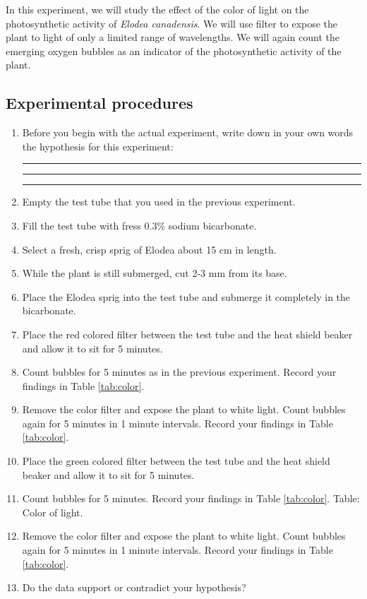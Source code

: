 \documentclass[]{book}
\begin{document}
In this experiment, we will study the effect of the color of light on the photosynthetic activity of \emph{Elodea canadensis}. We will use filter to expose the plant to light of only a limited range of wavelengths. We will again count the emerging oxygen bubbles as an indicator of the photosynthetic activity of the plant.

\hypertarget{experimental-procedures-25}{%
\subsection{Experimental procedures}\label{experimental-procedures-25}}

\begin{enumerate}
\def\labelenumi{\arabic{enumi}.}
\item
  Before you begin with the actual experiment, write down in your own words the hypothesis for this experiment:

  \begin{center}\rule{0.5\linewidth}{\linethickness}\end{center}

  \begin{center}\rule{0.5\linewidth}{\linethickness}\end{center}

  \begin{center}\rule{0.5\linewidth}{\linethickness}\end{center}
\item
  Empty the test tube that you used in the previous experiment.
\item
  Fill the test tube with fress 0.3\% sodium bicarbonate.
\item
  Select a fresh, crisp sprig of Elodea about 15 cm in length.
\item
  While the plant is still submerged, cut 2-3 mm from its base.
\item
  Place the Elodea sprig into the test tube and submerge it completely in the bicarbonate.
\item
  Place the red colored filter between the test tube and the heat shield beaker and allow it to sit for 5 minutes.
\item
  Count bubbles for 5 minutes as in the previous experiment. Record your findings in Table \ref{tab:color}.
\item
  Remove the color filter and expose the plant to white light. Count bubbles again for 5 minutes in 1 minute intervals. Record your findings in Table \ref{tab:color}.
\item
  Place the green colored filter between the test tube and the heat shield beaker and allow it to sit for 5 minutes.
\item
  Count bubbles for 5 minutes. Record your findings in Table \ref{tab:color}.
  Table: \label{tab:color} Color of light.
\item
  Remove the color filter and expose the plant to white light. Count bubbles again for 5 minutes in 1 minute intervals. Record your findings in Table \ref{tab:color}.
\item
  Do the data support or contradict your hypothesis?
\end{enumerate}
\end{document}
